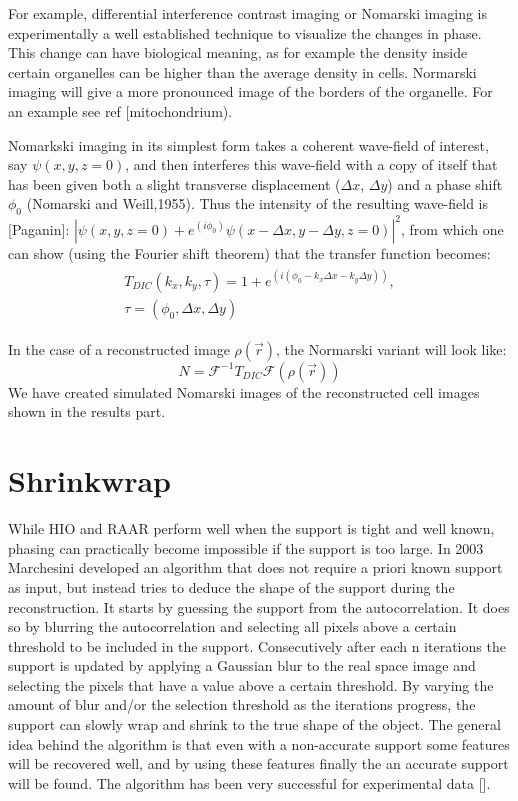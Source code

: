 For example, differential interference contrast imaging or Nomarski imaging is experimentally a well established technique to visualize the changes in phase. This change can have biological meaning, as for example the density inside certain organelles can be higher than the average density in cells. Normarski imaging will give a more pronounced image of the borders of the organelle. For an example see ref [mitochondrium). 

Nomarkski imaging in its simplest form takes a coherent wave-field of interest, say $\psi(x,y,z = 0)$, and then interferes this wave-field with a copy of itself that has been given both a slight transverse displacement ($\Delta x$, $\Delta y$) and a phase shift $\phi_0$ (Nomarski and Weill,1955). Thus the intensity of the resulting wave-field is [Paganin]:
$|\psi(x,y,z=0)+ e^{(i\phi_0)} \psi(x - \Delta x,y - \Delta y,z=0) |^2$, from which one can show (using the Fourier shift theorem) that the transfer function becomes:
\begin{equation}
\begin{aligned}
\begin{split}
T_{DIC}(k_x, k_y, \tau) = 1 + e^{(i(\phi_0 - k_x \Delta x - k_y \Delta y))},\\
\tau = (\phi_0, \Delta x, \Delta y)
\end{split}
\end{aligned}
\end{equation}

In the case of a reconstructed image $\rho(\vec{r})$, the Normarski variant will look like:
\begin{equation}
N = \mathcal{F}^{-1} T_{DIC} \mathcal{F}(\rho(\vec{r}))
\end{equation}
We have created simulated Nomarski images of the reconstructed cell images shown in the results part.

\section{Shrinkwrap}
While HIO and RAAR perform well when the support is tight and well known, phasing can practically become impossible if the support is too large. In 2003 Marchesini developed an algorithm that does not require a priori known support as input, but instead tries to deduce the shape of the support during the reconstruction. It starts by guessing the support from the autocorrelation. It does so by blurring the autocorrelation and selecting all pixels above a certain threshold to be included in the support. Consecutively after each n iterations the support is updated by applying a Gaussian blur to the real space image and selecting the pixels that have a value above a certain threshold. By varying the amount of blur and/or the selection threshold as the iterations progress, the support can slowly wrap and shrink to the true shape of the object. The general idea behind the algorithm is that even with a non-accurate support some features will be recovered well, and by using these features finally the an accurate support will be found. The algorithm has been very successful for experimental data [].

